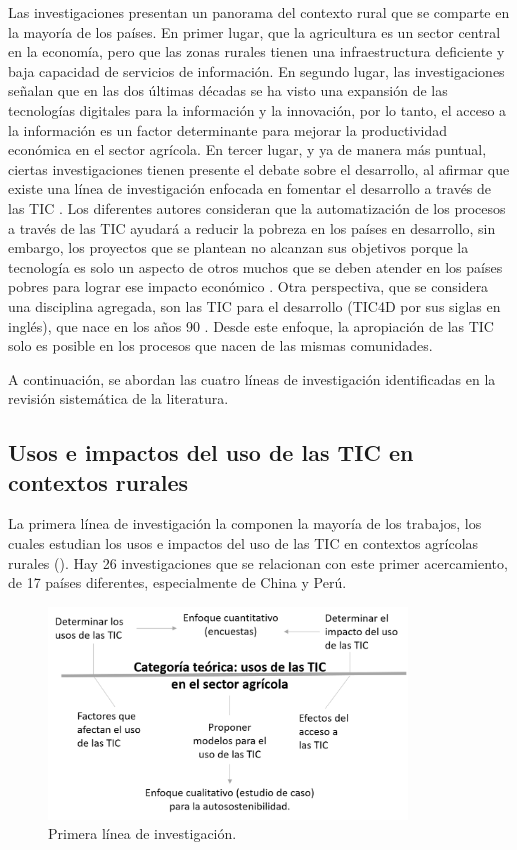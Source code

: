 \documentclass[spanish]{textolivre}
\begin{document}
Las investigaciones presentan un panorama del contexto rural que se comparte en la mayoría de los países. En primer lugar, que la agricultura es un sector central en la economía, pero que las zonas rurales tienen una infraestructura deficiente y baja capacidad de servicios de información. En segundo lugar, las investigaciones señalan que en las dos últimas décadas se ha visto una expansión de las tecnologías digitales para la información y la innovación, por lo tanto, el acceso a la información es un factor determinante para mejorar la productividad económica en el sector agrícola. En tercer lugar, y ya de manera más puntual, ciertas investigaciones tienen presente el debate sobre el desarrollo, al afirmar que existe una línea de investigación enfocada en fomentar el desarrollo a través de las TIC \cite{ye_citizen-led_2021}. Los diferentes autores consideran que la automatización de los procesos a través de las TIC ayudará a reducir la pobreza en los países en desarrollo, sin embargo, los proyectos que se plantean no alcanzan sus objetivos \cite{perez-estebanez_technological_2018} porque la tecnología es solo un aspecto de otros muchos que se deben atender en los países pobres para lograr ese impacto económico \cite{min_does_2020}. Otra perspectiva, que se considera una disciplina agregada, son las TIC para el desarrollo (TIC4D por sus siglas en inglés), que nace en los años 90 \cite{mariscal_aviles_informational_2016}. Desde este enfoque, la apropiación de las TIC solo es posible en los procesos que nacen de las mismas comunidades. 

A continuación, se abordan las cuatro líneas de investigación identificadas en la revisión sistemática de la literatura.

\subsection{Usos e impactos del uso de las TIC en contextos rurales }

La primera línea de investigación la componen la mayoría de los trabajos, los cuales estudian los usos e impactos del uso de las TIC en contextos agrícolas rurales (). Hay 26 investigaciones que se relacionan con este primer acercamiento, de 17 países diferentes, especialmente de China y Perú.

\begin{figure}[htbp]
\centering
\includegraphics[width=0.85\textwidth]{fig2.png}
\caption{Primera línea de investigación.}
\label{fig2}
\end{figure}
\end{document}
